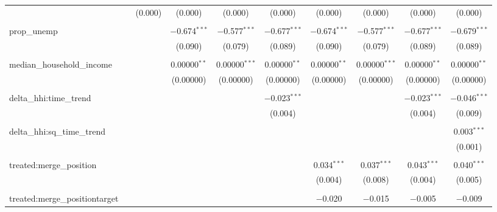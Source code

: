 \begin{table}[H]
{\begin{tabular}{@{\extracolsep{5pt}}lccccccccc}
   &  & (0.000) & (0.000) & (0.000) & (0.000) & (0.000) & (0.000) & (0.000) & (0.000) \\  

   & & & & & & & & & \\  

  prop\_unemp &  &  & $-$0.674$^{***}$ & $-$0.577$^{***}$ & $-$0.677$^{***}$ & $-$0.674$^{***}$ & $-$0.577$^{***}$ & $-$0.677$^{***}$ & $-$0.679$^{***}$ \\  

   &  &  & (0.090) & (0.079) & (0.089) & (0.090) & (0.079) & (0.089) & (0.089) \\  

   & & & & & & & & & \\  

  median\_household\_income &  &  & 0.00000$^{**}$ & 0.00000$^{***}$ & 0.00000$^{**}$ & 0.00000$^{**}$ & 0.00000$^{***}$ & 0.00000$^{**}$ & 0.00000$^{**}$ \\  

   &  &  & (0.00000) & (0.00000) & (0.00000) & (0.00000) & (0.00000) & (0.00000) & (0.00000) \\  

   & & & & & & & & & \\  

  delta\_hhi:time\_trend &  &  &  &  & $-$0.023$^{***}$ &  &  & $-$0.023$^{***}$ & $-$0.046$^{***}$ \\  

   &  &  &  &  & (0.004) &  &  & (0.004) & (0.009) \\  

   & & & & & & & & & \\  

  delta\_hhi:sq\_time\_trend &  &  &  &  &  &  &  &  & 0.003$^{***}$ \\  

   &  &  &  &  &  &  &  &  & (0.001) \\  

   & & & & & & & & & \\  

  treated:merge\_position &  &  &  &  &  & 0.034$^{***}$ & 0.037$^{***}$ & 0.043$^{***}$ & 0.040$^{***}$ \\  

   &  &  &  &  &  & (0.004) & (0.008) & (0.004) & (0.005) \\  

   & & & & & & & & & \\  

  treated:merge\_positiontarget &  &  &  &  &  & $-$0.020 & $-$0.015 & $-$0.005 & $-$0.009 \\  


\end{tabular}}
\end{table}
